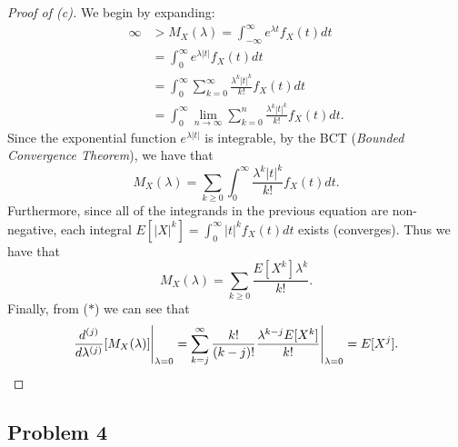 \documentclass[12pt,reqno]{article}
\renewcommand{\emph}[1]{\textit{#1}}
\theoremstyle{plain}
\theoremstyle{definition}
\begin{document}
\begin{proof}[Proof of (c)] 
We begin by expanding:
\begin{align*} 
\infty & > M_X(\lambda) = \int_{-\infty}^{\infty} e^{\lambda t} f_X(t) dt \\ 
     & = \int_0^{\infty} e^{\lambda |t|} f_X(t) dt \\ 
     & = \int_0^{\infty} \sum_{k=0}^{\infty} \frac{\lambda^k |t|^k}{k!} 
     f_X(t) dt \\ 
     & = \int_0^{\infty} \lim_{n \rightarrow \infty} \sum_{k=0}^n 
     \frac{\lambda^k |t|^k}{k!} f_X(t) dt. 
\end{align*} 
Since the exponential function $e^{\lambda |t|}$ is integrable, by the 
BCT (\emph{Bounded Convergence Theorem}), we have that 
\[
\tag{$\ast$} 
M_X(\lambda) = \sum_{k \geq 0} \int_0^{\infty} \frac{\lambda^k |t|^k}{k!} 
     f_X(t) dt. 
\]
Furthermore, since all of the integrands in the previous equation are 
non-negative, each integral $E[|X|^k] = \int_0^{\infty} |t|^k f_X(t) dt$ 
exists (converges). Thus we have that 
\[
M_X(\lambda) = \sum_{k \geq 0} \frac{E[X^k] \lambda^k}{k!}. 
\]
Finally, from ($\ast$) we can see that 
\[
\frac{d^{(j)}}{d\lambda^{(j)}}[M_X(\lambda)] \Biggr\rvert_{\lambda=0} = 
     \sum_{k=j}^{\infty} \frac{k!}{(k-j)!} \frac{\lambda^{k-j} E[X^k]}{k!} 
     \Biggr\rvert_{\lambda=0} = E[X^j].
     \qedhere
\]
\end{proof} 

\subsection{Problem 4}
\end{document}
